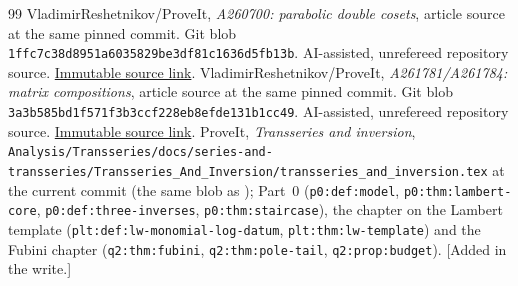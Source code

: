 \documentclass[11pt,a4paper]{article}
\theoremstyle{definition}\newtheorem{definition}[theorem]{Definition}
\theoremstyle{remark}\newtheorem{remark}[theorem]{Remark}
\newcommand{\file}[1]{\nolinkurl{#1}}
\begin{document}
\begin{thebibliography}{99}
 VladimirReshetnikov/ProveIt, \emph{A260700: parabolic double cosets}, article source at the same pinned commit. Git blob \texttt{1ffc7c38d8951a6035829be3df81c1636d5fb13b}. AI-assisted, unrefereed repository source. \href{https://github.com/VladimirReshetnikov/ProveIt/blob/c744ff67d111bf02d1daf2caaabeec7aaa4c7617/SetTheory/Cardinals/docs/reports/generating-functions-and-asymptotics/oeis-sequence-asymptotics/a260700-parabolic-double-cosets/article.tex}{Immutable source link}.
 VladimirReshetnikov/ProveIt, \emph{A261781/A261784: matrix compositions}, article source at the same pinned commit. Git blob \texttt{3a3b585bd1f571f3b3ccf228eb8efde131b1cc49}. AI-assisted, unrefereed repository source. \href{https://github.com/VladimirReshetnikov/ProveIt/blob/c744ff67d111bf02d1daf2caaabeec7aaa4c7617/SetTheory/Cardinals/docs/reports/generating-functions-and-asymptotics/oeis-sequence-asymptotics/a261781-matrix-compositions/article.tex}{Immutable source link}.
 ProveIt, \emph{Transseries and inversion}, \file{Analysis/Transseries/docs/series-and-transseries/Transseries_And_Inversion/transseries_and_inversion.tex} at the current commit (the same blob as \cite{transseries}); Part~0 (\file{p0:def:model}, \file{p0:thm:lambert-core}, \file{p0:def:three-inverses}, \file{p0:thm:staircase}), the chapter on the Lambert template (\file{plt:def:lw-monomial-log-datum}, \file{plt:thm:lw-template}) and the Fubini chapter (\file{q2:thm:fubini}, \file{q2:thm:pole-tail}, \file{q2:prop:budget}). [Added in the write.]
\end{thebibliography}
\end{document}
